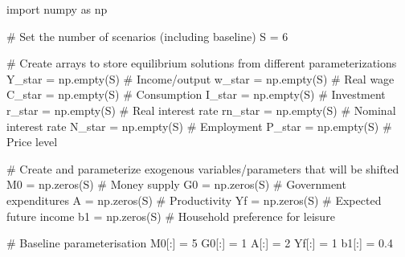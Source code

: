 \documentclass[
  letterpaper,
  DIV=11,
  numbers=noendperiod]{scrreprt}
\newenvironment{Shaded}{\begin{snugshade}}{\end{snugshade}}
\newcommand{\CommentTok}[1]{\textcolor[rgb]{0.37,0.37,0.37}{#1}}
\newcommand{\DecValTok}[1]{\textcolor[rgb]{0.68,0.00,0.00}{#1}}
\newcommand{\FloatTok}[1]{\textcolor[rgb]{0.68,0.00,0.00}{#1}}
\newcommand{\ImportTok}[1]{\textcolor[rgb]{0.00,0.46,0.62}{#1}}
\newcommand{\NormalTok}[1]{\textcolor[rgb]{0.00,0.23,0.31}{#1}}
\newcommand{\OperatorTok}[1]{\textcolor[rgb]{0.37,0.37,0.37}{#1}}
\begin{document}
\begin{tcolorbox}[enhanced jigsaw, titlerule=0mm, breakable, bottomrule=.15mm, toprule=.15mm, colbacktitle=quarto-callout-note-color!10!white, rightrule=.15mm, toptitle=1mm, opacityback=0, left=2mm, coltitle=black, title=\textcolor{quarto-callout-note-color}{\faInfo}\hspace{0.5em}{Python code}, colframe=quarto-callout-note-color-frame, opacitybacktitle=0.6, leftrule=.75mm, bottomtitle=1mm, arc=.35mm, colback=white]

\begin{Shaded}
\begin{Highlighting}[]
\ImportTok{import}\NormalTok{ numpy }\ImportTok{as}\NormalTok{ np}

\CommentTok{\# Set the number of scenarios (including baseline)}
\NormalTok{S }\OperatorTok{=} \DecValTok{6}

\CommentTok{\# Create arrays to store equilibrium solutions from different parameterizations}
\NormalTok{Y\_star }\OperatorTok{=}\NormalTok{ np.empty(S)  }\CommentTok{\# Income/output}
\NormalTok{w\_star }\OperatorTok{=}\NormalTok{ np.empty(S)  }\CommentTok{\# Real wage}
\NormalTok{C\_star }\OperatorTok{=}\NormalTok{ np.empty(S)  }\CommentTok{\# Consumption}
\NormalTok{I\_star }\OperatorTok{=}\NormalTok{ np.empty(S)  }\CommentTok{\# Investment}
\NormalTok{r\_star }\OperatorTok{=}\NormalTok{ np.empty(S)  }\CommentTok{\# Real interest rate}
\NormalTok{rn\_star }\OperatorTok{=}\NormalTok{ np.empty(S)  }\CommentTok{\# Nominal interest rate}
\NormalTok{N\_star }\OperatorTok{=}\NormalTok{ np.empty(S)  }\CommentTok{\# Employment}
\NormalTok{P\_star }\OperatorTok{=}\NormalTok{ np.empty(S)  }\CommentTok{\# Price level}

\CommentTok{\# Create and parameterize exogenous variables/parameters that will be shifted}
\NormalTok{M0 }\OperatorTok{=}\NormalTok{ np.zeros(S)  }\CommentTok{\# Money supply}
\NormalTok{G0 }\OperatorTok{=}\NormalTok{ np.zeros(S)  }\CommentTok{\# Government expenditures}
\NormalTok{A }\OperatorTok{=}\NormalTok{ np.zeros(S)   }\CommentTok{\# Productivity}
\NormalTok{Yf }\OperatorTok{=}\NormalTok{ np.zeros(S)  }\CommentTok{\# Expected future income}
\NormalTok{b1 }\OperatorTok{=}\NormalTok{ np.zeros(S)  }\CommentTok{\# Household preference for leisure}

\CommentTok{\# Baseline parameterisation}
\NormalTok{M0[:] }\OperatorTok{=} \DecValTok{5}
\NormalTok{G0[:] }\OperatorTok{=} \DecValTok{1}
\NormalTok{A[:] }\OperatorTok{=} \DecValTok{2}
\NormalTok{Yf[:] }\OperatorTok{=} \DecValTok{1}
\NormalTok{b1[:] }\OperatorTok{=} \FloatTok{0.4}


\end{Highlighting}
\end{Shaded}
\end{tcolorbox}
\end{document}
